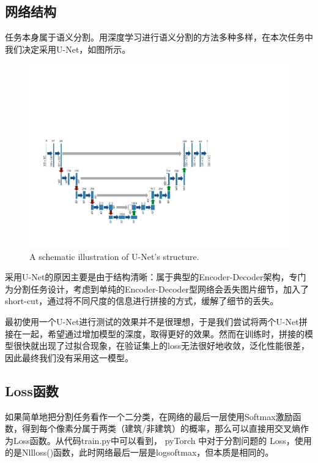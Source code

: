 \documentclass[a4paper,12pt]{article}
\begin{document}
\begin{CJK*}{UTF8}{gbsn}
\begin{spacing}{1.2}
    \section{网络结构}
    任务本身属于语义分割。用深度学习进行语义分割的方法多种多样，在本次任务中我们决定采用U-Net，如图所示。
    \begin{figure} [!]
    \centering
    \includegraphics[width=14.0cm]{U_Net.pdf}
    \caption{A schematic illustration of U-Net's structure.}
    \label{fig:Fig 1}
    \end{figure}
    采用U-Net的原因主要是由于结构清晰：属于典型的Encoder-Decoder架构，专门为分割任务设计，考虑到单纯的Encoder-Decoder型网络会丢失图片细节，加入了short-cut，通过将不同尺度的信息进行拼接的方式，缓解了细节的丢失。
    
    最初使用一个U-Net进行测试的效果并不是很理想，于是我们尝试将两个U-Net拼接在一起，希望通过增加模型的深度，取得更好的效果。然而在训练时，拼接的模型很快就出现了过拟合现象，在验证集上的loss无法很好地收敛，泛化性能很差，因此最终我们没有采用这一模型。
    
    \subsection{Loss函数}
    如果简单地把分割任务看作一个二分类，在网络的最后一层使用Softmax激励函数，得到每个像素分属于两类（建筑/非建筑）的概率，那么可以直接用交叉熵作为Loss函数。从代码train.py中可以看到， pyTorch 中对于分割问题的 Loss，使用的是Nllloss()函数，此时网络最后一层是logsoftmax，但本质是相同的。
    

\end{spacing}
\end{CJK*}
\end{document}
